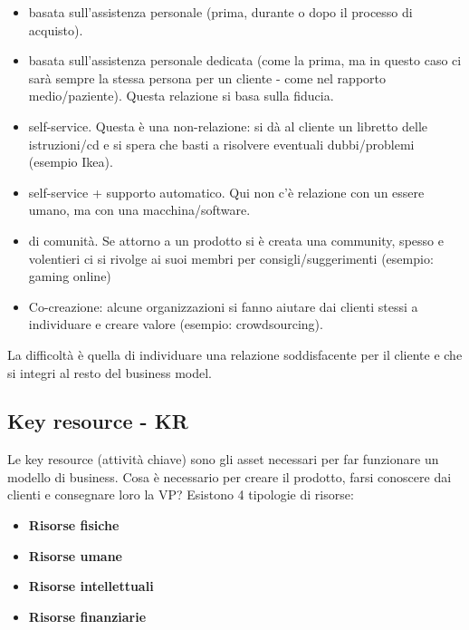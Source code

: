 \begin{itemize}

\item basata sull'assistenza personale (prima, durante o dopo il processo di
acquisto).

\item basata sull'assistenza personale dedicata (come la prima, ma in questo
caso ci sarà sempre la stessa persona per un cliente - come nel rapporto
medio/paziente). Questa relazione si basa sulla fiducia.

\item self-service. Questa è una non-relazione: si dà al cliente un libretto
delle istruzioni/cd e si spera che basti a risolvere eventuali dubbi/problemi
(esempio Ikea).

\item self-service + supporto automatico. Qui non c'è relazione con un essere
umano, ma con una macchina/software.

\item di comunità. Se attorno a un prodotto si è creata una community, spesso e
volentieri ci si rivolge ai suoi membri per consigli/suggerimenti (esempio:
gaming online)

\item Co-creazione: alcune organizzazioni si fanno aiutare dai clienti stessi
a individuare e creare valore (esempio: crowdsourcing).

\end{itemize}

La difficoltà è quella di individuare una relazione soddisfacente per il
cliente e che si integri al resto del business model.

\subsection{Key resource - KR}

Le key resource (attività chiave) sono gli asset necessari per far funzionare
un modello di business.
Cosa è necessario per creare il prodotto, farsi conoscere dai clienti e
consegnare loro la VP?
Esistono 4 tipologie di risorse:

\begin{itemize}
 \item \textbf{Risorse fisiche}
 \item \textbf{Risorse umane}
 \item \textbf{Risorse intellettuali}
 \item \textbf{Risorse finanziarie}
\end{itemize}

